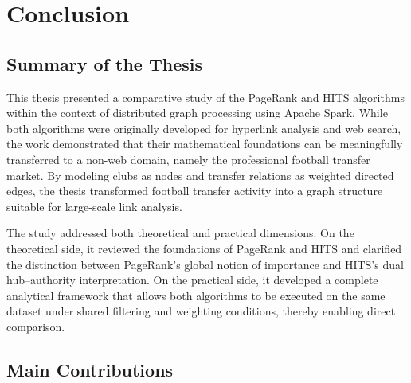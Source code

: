 \chapter{Conclusion}
\label{ch:conclusion}

\section{Summary of the Thesis}
\label{sec:conclusion_summary}

This thesis presented a comparative study of the PageRank and HITS algorithms within the context of distributed graph processing using Apache Spark. While both algorithms were originally developed for hyperlink analysis and web search, the work demonstrated that their mathematical foundations can be meaningfully transferred to a non-web domain, namely the professional football transfer market. By modeling clubs as nodes and transfer relations as weighted directed edges, the thesis transformed football transfer activity into a graph structure suitable for large-scale link analysis.

The study addressed both theoretical and practical dimensions. On the theoretical side, it reviewed the foundations of PageRank and HITS and clarified the distinction between PageRank's global notion of importance and HITS's dual hub--authority interpretation. On the practical side, it developed a complete analytical framework that allows both algorithms to be executed on the same dataset under shared filtering and weighting conditions, thereby enabling direct comparison.

\section{Main Contributions}
\label{sec:conclusion_contributions}

